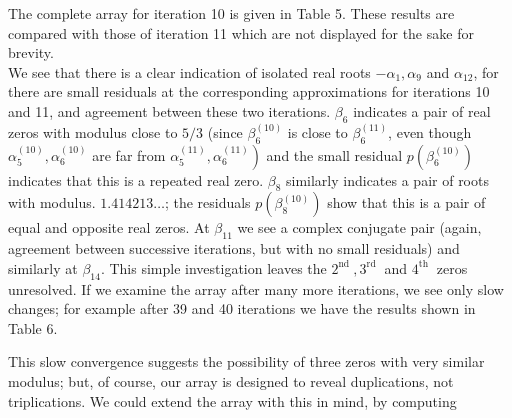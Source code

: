 \documentclass[10pt]{article}
\begin{document}
The complete array for iteration 10 is given in Table 5. These results are compared with those of iteration 11 which are not displayed for the sake for brevity.\\
We see that there is a clear indication of isolated real roots $-\alpha_{1}, \alpha_{9}$ and $\alpha_{12}$, for there are small residuals at the corresponding approximations for iterations 10 and 11, and agreement between these two iterations. $\beta_{6}$ indicates a pair of real zeros with modulus close to $5 / 3$ (since $\beta_{6}^{(10)}$ is close to $\beta_{6}^{(11)}$, even though $\alpha_{5}^{(10)}, \alpha_{6}^{(10)}$ are far from $\left.\alpha_{5}^{(11)}, \alpha_{6}^{(11)}\right)$ and the small residual $p\left(\beta_{6}^{(10)}\right)$ indicates that this is a repeated real zero. $\beta_{8}$ similarly indicates a pair of roots with modulus. $1.414213 \ldots$; the residuals $p\left(\beta_{8}^{(10)}\right)$ show that this is a pair of equal and opposite real zeros. At $\beta_{11}$ we see a complex conjugate pair (again, agreement between successive iterations, but with no small residuals) and similarly at $\beta_{14}$. This simple investigation leaves the $2^{\text {nd }}, 3^{\text {rd }}$ and $4^{\text {th }}$ zeros unresolved. If we examine the array after many more iterations, we see only slow changes; for example after 39 and 40 iterations we have the results shown in Table 6.

This slow convergence suggests the possibility of three zeros with very similar modulus; but, of course, our array is designed to reveal duplications, not triplications. We could extend the array with this in mind, by computing
\end{document}
